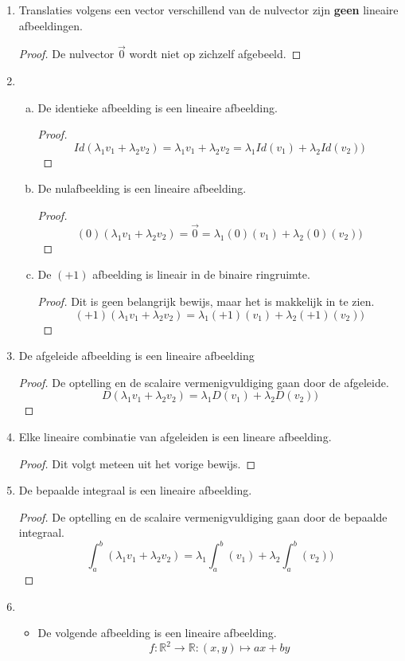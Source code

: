 \documentclass[lineaire_algebra_oplossingen.tex]{subfiles}
\begin{document}
\begin{enumerate}
\item Translaties volgens een vector verschillend van de nulvector zijn \textbf{geen} lineaire afbeeldingen.
\begin{proof}
De nulvector $\vec{0}$ wordt niet op zichzelf afgebeeld.
\end{proof}
\item
\begin{enumerate}[a)]
\item De identieke afbeelding is een lineaire afbeelding.
\begin{proof}
\[
Id(\lambda_1v_1+\lambda_2v_2) = \lambda_1v_1+\lambda_2v_2 = \lambda_1Id(v_1)+\lambda_2Id(v_2))
\]
\end{proof}
\item De nulafbeelding is een lineaire afbeelding.
\begin{proof}
\[
(0)(\lambda_1v_1+\lambda_2v_2) = \vec{0} = \lambda_1(0)(v_1)+\lambda_2(0)(v_2))
\]
\end{proof}
\item De $(+1)$ afbeelding is lineair in de binaire ringruimte.
\begin{proof}
Dit is geen belangrijk bewijs, maar het is makkelijk in te zien.
\[
(+1)(\lambda_1v_1+\lambda_2v_2) = \lambda_1(+1)(v_1)+\lambda_2(+1)(v_2))
\]
\end{proof}
\end{enumerate}
\item De afgeleide afbeelding is een lineaire afbeelding
\begin{proof}
De optelling en de scalaire vermenigvuldiging gaan door de afgeleide.
\[
D(\lambda_1v_1+\lambda_2v_2) = \lambda_1D(v_1)+\lambda_2D(v_2))
\]
\end{proof}
\item Elke lineaire combinatie van afgeleiden is een lineare afbeelding.
\begin{proof}
Dit volgt meteen uit het vorige bewijs.
\end{proof}
\item De bepaalde integraal is een lineaire afbeelding.
\begin{proof}
De optelling en de scalaire vermenigvuldiging gaan door de bepaalde integraal.
\[
\int_a^b(\lambda_1v_1+\lambda_2v_2) = \lambda_1\int_a^b(v_1)+\lambda_2\int_a^b(v_2))
\]
\end{proof}
\item 
\begin{itemize}
\item
De volgende afbeelding is een lineaire afbeelding.
\[f: \mathbb{R}^2 \rightarrow \mathbb{R}: (x,y) \mapsto ax+by\]

\end{itemize}
\end{enumerate}
\end{document}
